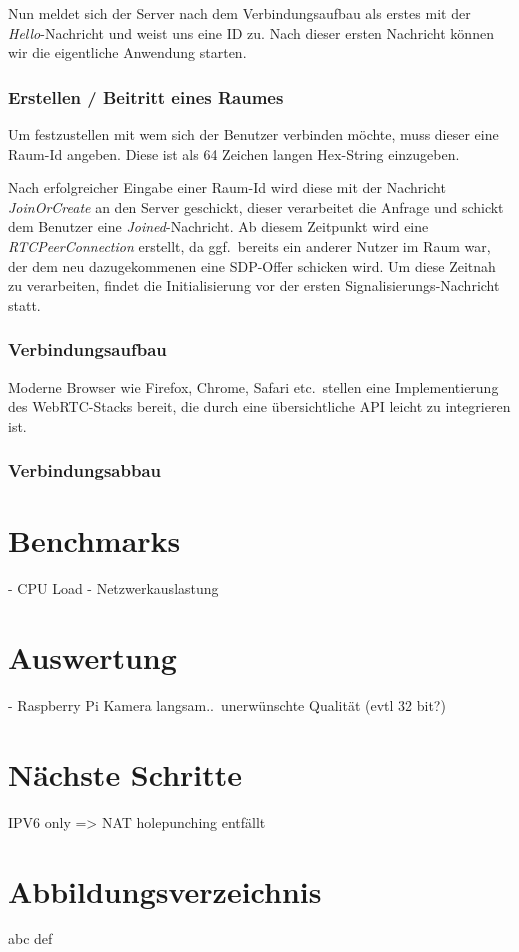 \documentclass[journal]{IEEEtran}
\begin{document}
\begin{twocolumn}
Nun meldet sich der Server nach dem Verbindungsaufbau als erstes mit der
\textit{Hello}-Nachricht und weist uns eine ID zu. Nach dieser ersten Nachricht
können wir die eigentliche Anwendung starten.

\subsubsection{Erstellen / Beitritt eines Raumes}

Um festzustellen mit wem sich der Benutzer verbinden möchte, muss dieser
eine Raum-Id angeben. Diese ist als 64 Zeichen langen Hex-String einzugeben.

Nach erfolgreicher Eingabe einer Raum-Id wird diese mit der Nachricht
\textit{JoinOrCreate} an den Server geschickt, dieser verarbeitet die Anfrage
und schickt dem Benutzer eine \textit{Joined}-Nachricht. Ab diesem Zeitpunkt
wird eine \textit{RTCPeerConnection} erstellt, da ggf.\ bereits ein anderer
Nutzer im Raum war, der dem neu dazugekommenen eine SDP-Offer schicken wird.
Um diese Zeitnah zu verarbeiten, findet die Initialisierung vor der ersten
Signalisierungs-Nachricht statt.


\subsubsection{Verbindungsaufbau}

Moderne Browser wie Firefox, Chrome, Safari etc.\ stellen eine Implementierung
des WebRTC-Stacks bereit, die durch eine übersichtliche API leicht zu
integrieren ist. %

\subsubsection{Verbindungsabbau}


\section{Benchmarks}

- CPU Load
- Netzwerkauslastung

\section{Auswertung}

- Raspberry Pi Kamera langsam..\ unerwünschte Qualität (evtl 32 bit?)

\section{Nächste Schritte}

\large{IPV6 only => NAT holepunching entfällt}

\section{Abbildungsverzeichnis}
abc
def



\end{twocolumn}
\end{document}
